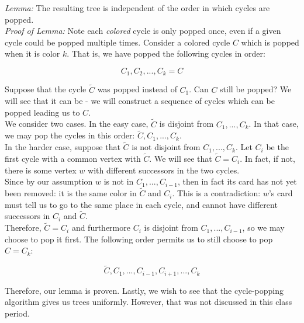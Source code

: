 \documentclass{article}
\begin{document}
	\textit{Lemma:} The resulting tree is independent of the order in which cycles are popped. \\ 
	
	\textit{Proof of Lemma:} Note each \textit{colored} cycle is only popped once, even if a given cycle could be popped multiple times. Consider a colored cycle $C$ which is popped when it is color $k$. That is, we have popped the following cycles in order: 
	
	$$C_1, C_2, ..., C_k = C $$
	
	Suppose that the cycle $\tilde{C}$ was popped instead of $C_1$. Can $C$ still be popped? We will see that it can be - we will construct a sequence of cycles which can be popped leading us to $C$. \\
	
	We consider two cases. In the easy case, $\tilde{C}$ is disjoint from $C_1,...,C_k$. In that case, we may pop the cycles in this order: $\tilde{C}, C_1,..., C_k$. \\
	
	In the harder case, suppose that $\tilde{C}$ is not disjoint from $C_1,...,C_k$. Let $C_i$ be the first cycle with a common vertex with $\tilde{C}$. We will see that $\tilde{C}=C_i$. In fact, if not, there is some vertex $w$ with different successors in the two cycles. \\
	
	Since by our assumption $w$ is not in $C_1, ... , C_{i-1}$, then in fact its card has not yet been removed: it is the same color in $\tilde{C}$ and $C_i$. This is a contradiction: $w$'s card must tell us to go to the same place in each cycle, and cannot have different successors in $C_i$ and $\tilde{C}$. \\ 
	
	Therefore, $\tilde{C} = C_i$ and furthermore $C_i$ is disjoint from $C_1,...,C_{i-1}$, so we may choose to pop it first. The following order permits us to still choose to pop $C=C_k$: 
	
	$$\tilde{C}, C_1,...,C_{i-1}, C_{i+1}, ... , C_k$$
	
	Therefore, our lemma is proven. Lastly, we wish to see that the cycle-popping algorithm gives us trees uniformly. However, that was not discussed in this class period. 
	
	
	
	  
\end{document}
